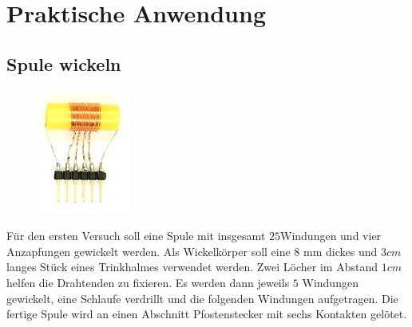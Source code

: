 

\newpage

\section{Praktische Anwendung}

\subsection*{Spule wickeln}

\begin{figure}
 \vspace{-10pt}
 \centering 
 \includegraphics[scale=4]{Spule/Bilder/Spule_bau.jpg}
 \vspace{-5pt}
\end{figure}

Für den ersten Versuch soll eine Spule mit insgesamt $25 $Windungen und vier Anzapfungen gewickelt werden. Als Wickelkörper soll eine 8 mm dickes und $3cm$ langes Stück eines Trinkhalmes verwendet werden. Zwei Löcher im Abstand $1cm$ helfen die Drahtenden zu fixieren. Es werden dann jeweils $5$ Windungen gewickelt, eine Schlaufe verdrillt und die folgenden Windungen aufgetragen. Die fertige Spule wird an einen Abschnitt Pfostenstecker mit sechs Kontakten gelötet. 

